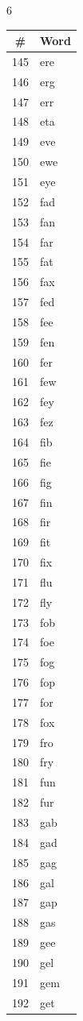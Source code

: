 \documentclass[11pt,a4paper]{article}
\begin{document}
\begin{multicols}{6}
\columnbreak

\begin{tabular}{cl}
\toprule
\# & Word \\
\midrule
145 & ere \\
146 & erg \\
147 & err \\
148 & eta \\
149 & eve \\
150 & ewe \\
151 & eye \\
152 & fad \\
153 & fan \\
154 & far \\
155 & fat \\
156 & fax \\
157 & fed \\
158 & fee \\
159 & fen \\
160 & fer \\
161 & few \\
162 & fey \\
163 & fez \\
164 & fib \\
165 & fie \\
166 & fig \\
167 & fin \\
168 & fir \\
169 & fit \\
170 & fix \\
171 & flu \\
172 & fly \\
173 & fob \\
174 & foe \\
175 & fog \\
176 & fop \\
177 & for \\
178 & fox \\
179 & fro \\
180 & fry \\
181 & fun \\
182 & fur \\
183 & gab \\
184 & gad \\
185 & gag \\
186 & gal \\
187 & gap \\
188 & gas \\
189 & gee \\
190 & gel \\
191 & gem \\
192 & get \\
\bottomrule
\end{tabular}


\end{multicols}
\end{document}

